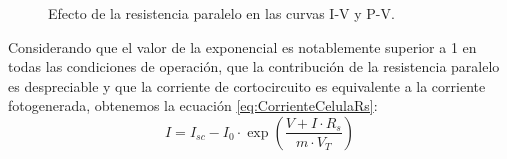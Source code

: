 %
\begin{figure}
\hfill{}\hfill{}\hfill{}

\caption{Efecto de la resistencia paralelo en las curvas I-V y P-V.\label{fig:EfectoRsh}}

\end{figure}


Considerando que el valor de la exponencial es notablemente superior
a 1 en todas las condiciones de operación, que la contribución de
la resistencia paralelo es despreciable y que la corriente de cortocircuito
es equivalente a la corriente fotogenerada, obtenemos la ecuación
\ref{eq:CorrienteCelulaRs}: \begin{equation}
I=I_{sc}-I_{0}\cdot\exp(\frac{V+I\cdot R_{s}}{m\cdot V_{T}})\label{eq:CorrienteCelulaRs}\end{equation}


